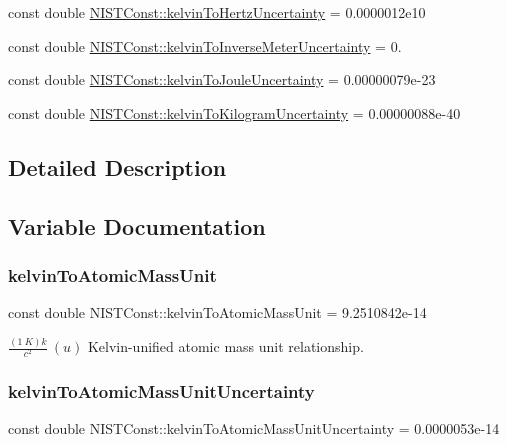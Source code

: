 \begin{DoxyCompactItemize}
const double \hyperlink{group___n_i_s_t_const-_kelvin_gaab1ae20957d14cd50d787ad307a1a45d}{N\+I\+S\+T\+Const\+::kelvin\+To\+Hertz\+Uncertainty} = 0.\+0000012e10
\item 
const double \hyperlink{group___n_i_s_t_const-_kelvin_ga8867224cfd317842c338873d002a4f94}{N\+I\+S\+T\+Const\+::kelvin\+To\+Inverse\+Meter\+Uncertainty} = 0.
\item 
const double \hyperlink{group___n_i_s_t_const-_kelvin_ga53c28e7735a083676a91272677dd1e89}{N\+I\+S\+T\+Const\+::kelvin\+To\+Joule\+Uncertainty} = 0.\+00000079e-\/23
\item 
const double \hyperlink{group___n_i_s_t_const-_kelvin_gaa6783c525ec480ef30ad433a44bb5f33}{N\+I\+S\+T\+Const\+::kelvin\+To\+Kilogram\+Uncertainty} = 0.\+00000088e-\/40
\end{DoxyCompactItemize}


\subsection{Detailed Description}


\subsection{Variable Documentation}
\mbox{\label{group___n_i_s_t_const-_kelvin_gadad57a8f65f4d323846c97fbe0c485b1}} 
\subsubsection{\texorpdfstring{kelvin\+To\+Atomic\+Mass\+Unit}{kelvinToAtomicMassUnit}}
{\footnotesize\ttfamily const double N\+I\+S\+T\+Const\+::kelvin\+To\+Atomic\+Mass\+Unit = 9.\+2510842e-\/14}

$\frac{(1\ K)k}{c^2} \ (u)$ Kelvin-\/unified atomic mass unit relationship. \mbox{\label{group___n_i_s_t_const-_kelvin_ga9a73cc5e600276756aa8054000db2a12}} 
\subsubsection{\texorpdfstring{kelvin\+To\+Atomic\+Mass\+Unit\+Uncertainty}{kelvinToAtomicMassUnitUncertainty}}
{\footnotesize\ttfamily const double N\+I\+S\+T\+Const\+::kelvin\+To\+Atomic\+Mass\+Unit\+Uncertainty = 0.\+0000053e-\/14}

